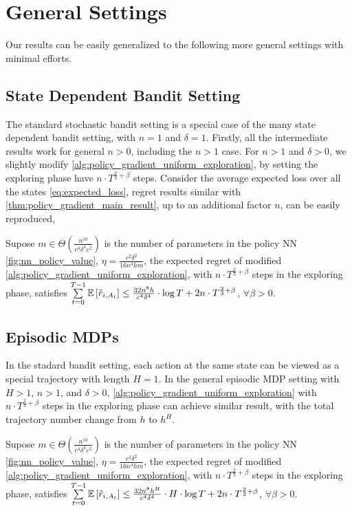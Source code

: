 \section{General Settings}
\label{sec:general_settings}

Our results can be easily generalized to the following more general settings with minimal efforts.

\subsection{State Dependent Bandit Setting}

The standard stochastic bandit setting is a special case of the many state dependent bandit setting, with $n = 1$ and $\delta = 1$. Firstly, all the intermediate results work for general $n > 0$, including the $n > 1$ case.
For $n > 1$ and $\delta > 0$, we slightly modify \cref{alg:policy_gradient_uniform_exploration}, by setting the exploring phase have $n \cdot T^{\frac{2}{3} + \beta}$ steps. Consider the average expected loss over all the states \cref{eq:expected_loss}, regret results similar with \cref{thm:policy_gradient_main_result}, up to an additional factor $n$, can be easily reproduced,
\begin{thm}
\label{thm:many_state_dependent_bandit_setting}
     Supose $m \in \Theta\left( \frac{n^{10}}{c^4 \delta^4 \varepsilon^2} \right)$ is the number of parameters in the policy NN \cref{fig:nn_policy_value}, $\eta = \frac{c^2 \delta^2}{16 n^4 h m}$, the expected regret of modified \cref{alg:policy_gradient_uniform_exploration}, with $n \cdot T^{\frac{2}{3}+\beta}$ steps in the exploring phase, satisfies $\sum\limits_{t=0}^{T-1}{ {\mathbb{E}} \left[ \tilde{r}_{i, A_t} \right] } \le  \frac{32n^8h}{ c^4 \delta^4} \cdot \log{T} + 2n \cdot T^{\frac{2}{3} + \beta }$, $\forall \beta > 0$.
\end{thm}

\subsection{Episodic MDPs}

In the stadard bandit setting, each action at the same state can be viewed as a special trajectory with length $H = 1$. In the general episodic MDP setting with $H > 1$, $n > 1$, and $\delta > 0$, \cref{alg:policy_gradient_uniform_exploration} with $n \cdot T^{\frac{2}{3}+\beta}$ steps in the exploring phase can achieve similar result, with the total trajectory number change from $h$ to $h^H$.
\begin{thm}
\label{thm:episodic_mdp_setting}
     Supose $m \in \Theta\left( \frac{n^{10}}{c^4 \delta^4 \varepsilon^2} \right)$ is the number of parameters in the policy NN \cref{fig:nn_policy_value}, $\eta = \frac{c^2 \delta^2}{16 n^4 h m}$, the expected regret of modified \cref{alg:policy_gradient_uniform_exploration}, with $n \cdot T^{\frac{2}{3}+\beta}$ steps in the exploring phase, satisfies $\sum\limits_{t=0}^{T-1}{ {\mathbb{E}} \left[ \tilde{r}_{i, A_t} \right] } \le  \frac{32n^8h^H}{ c^4 \delta^4} \cdot H \cdot \log{T} + 2n \cdot T^{\frac{2}{3} + \beta }$, $\forall \beta > 0$.
\end{thm}

